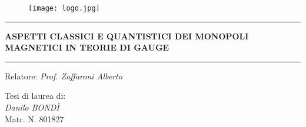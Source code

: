 \begin{titlepage}


\vspace{0.5cm}

\begin{figure}[h]
\centering
\texttt{[image: logo.jpg]}
\end{figure}

\vspace{2cm}
\hrule
\vspace{0.5cm}

\centering\huge\textbf{
   ASPETTI CLASSICI E QUANTISTICI DEI MONOPOLI MAGNETICI IN TEORIE DI GAUGE}

\vspace{0.5cm}
\hrule
\vspace{2cm}

\Large
\raggedright Relatore: \emph{Prof. Zaffaroni Alberto} \par
\begin{table}[h]
\Large
	Tesi di laurea di: \\
	\emph{Danilo BONDÌ} \\
	Matr. N. 801827\\
\end{table}

\vspace{1cm}
\large
\vfill{}

\end{titlepage}



 		\setcounter{page}{2}
         \null
         \thispagestyle{empty}
         \newpage

\tableofcontents

\newpage

